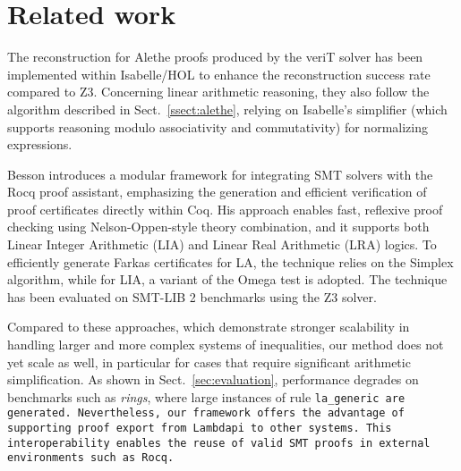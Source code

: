 \documentclass[runningheads,envcountsame]{llncs}
\begin{document}










\section{Related work}
\label{sec:related}

The reconstruction for Alethe proofs produced by the veriT solver has been implemented within Isabelle/HOL \cite{aletheInIsa} to enhance the reconstruction success rate compared to Z3.
Concerning linear arithmetic reasoning, they also follow the algorithm described in Sect.~\ref{ssect:alethe}, relying on Isabelle's simplifier (which supports reasoning modulo associativity and commutativity) for normalizing expressions.

Besson \cite{micromega} introduces a modular framework for integrating SMT solvers with the Rocq proof assistant, emphasizing the generation and efficient verification of proof certificates directly within Coq.
His approach enables fast, reflexive proof checking using Nelson-Oppen-style theory combination, and it supports both Linear Integer Arithmetic (LIA) and Linear Real Arithmetic (LRA) logics.
To efficiently generate Farkas certificates for LA, the technique relies on the Simplex algorithm, while for LIA, a variant of the Omega test \cite{omegatest} is adopted.
The technique has been evaluated on SMT-LIB 2 benchmarks using the Z3 solver.

Compared to these approaches, which demonstrate stronger scalability in handling larger and more complex systems of inequalities, our method does not yet scale as well, in particular for cases that require significant arithmetic simplification.
As shown in Sect.~\ref{sec:evaluation}, performance degrades on benchmarks such as \emph{rings}, where large instances of rule \tt{la\_generic} are generated.
Nevertheless, our framework offers the advantage of supporting proof export from Lambdapi to other systems. This interoperability enables the reuse of valid SMT proofs in external environments such as Rocq.
\end{document}
